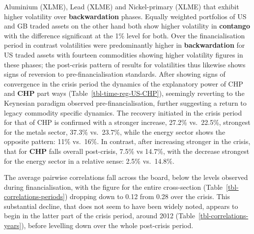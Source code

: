 \documentclass[
  authoryear,
  preprint,
  3p]{elsarticle}
\begin{document}
Aluminium (XLME), Lead (XLME) and Nickel-primary (XLME) that exhibit
higher volatility over \textbf{backwardation} phases. Equally weighted
portfolios of US and GB traded assets on the other hand both show higher
volatility in \textbf{contango} with the difference significant at the
1\% level for both. Over the financialisation period in contrast
volatilities were predominantly higher in \textbf{backwardation} for US
traded assets with fourteen commodities showing higher volatility
figures in these phases; the post-crisis pattern of results for
volatilities thus likewise shows signs of reversion to
pre-financialisation standards. After showing signs of convergence in
the crisis period the dynamics of the explanatory power of CHP and
\textbf{CHP} part ways (Table~\ref{tbl-time-reg-US-CHP}), seemingly
reverting to the Keynesian paradigm observed pre-financialisation,
further suggesting a return to legacy commodity specific dynamics. The
recovery initiated in the crisis period for that of CHP is confirmed
with a stronger increase, 27.2\% vs.~22.5\%, strongest for the metals
sector, 37.3\% vs.~23.7\%, while the energy sector shows the opposite
pattern: 11\% vs.~16\%. In contrast, after increasing stronger in the
crisis, that for \textbf{CHP} falls overall post-crisis, 7.5\% vs
14.7\%, with the decrease strongest for the energy sector in a relative
sense: 2.5\% vs.~14.8\%.

\medskip

The average pairwise correlations fall across the board, below the
levels observed during financialisation, with the figure for the entire
cross-section (Table~\ref{tbl-correlations-periods}) dropping down to
0.12 from 0.28 over the crisis. This substantial decline, that does not
seem to have been widely noted, appears to begin in the latter part of
the crisis period, around 2012 (Table~\ref{tbl-correlations-years}),
before levelling down over the whole post-crisis period.

\medskip
\end{document}

